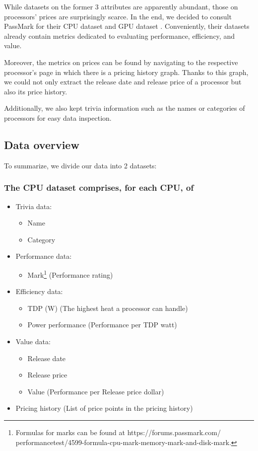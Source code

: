 \documentclass[conference]{IEEEtran}
\begin{document}
While datasets on the former 3 attributes are apparently abundant, those
on processors' prices are surprisingly scarce. In the end, we decided to
consult PassMark for their CPU dataset \cite{PassMarkCPU:2023} and GPU dataset
\cite{PassMarkGPU:2023}. Conveniently, their datasets already contain metrics
dedicated to evaluating performance, efficiency, and value.

Moreover, the metrics on prices can be found by navigating to the respective
processor's page in which there is a pricing history graph. Thanks to this
graph, we could not only extract the release date and release price of a
processor but also its price history.

Additionally, we also kept trivia information such as the names or categories
of processors for easy data inspection.

\subsection{Data overview}
To summarize, we divide our data into 2 datasets:
\subsubsection{The CPU dataset comprises, for each CPU, of}
\begin{itemize}
	\item Trivia data:
	      \begin{itemize}
		      \item Name
		      \item Category
	      \end{itemize}
	\item Performance data:
	      \begin{itemize}
		      \item Mark\footnote{Formulas for marks can be found at https://forums.passmark.com/\\performancetest/4599-formula-cpu-mark-memory-mark-and-disk-mark.}
		            (Performance rating)
	      \end{itemize}
	\item Efficiency data:
	      \begin{itemize}
		      \item TDP (W) (The highest heat a processor can handle)
		      \item Power performance (Performance per TDP watt)
	      \end{itemize}
	\item Value data:
	      \begin{itemize}
		      \item Release date
		      \item Release price
		      \item Value (Performance per Release price dollar)
	      \end{itemize}
	\item Pricing history (List of price points in the pricing history)
\end{itemize}
\end{document}
